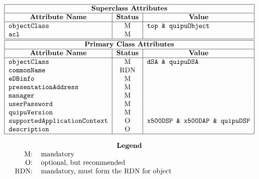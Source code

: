 
\[\begin{tabular}{|l|c|l|}
\hline
\multicolumn{3}{|c|}{\bf Superclass Attributes}\\
\hline
\multicolumn{1}{|c|}{\bf Attribute Name}&
			\multicolumn{1}{c|}{\bf Status}&
				\multicolumn{1}{c|}{\bf Value}\\
\hline
\verb"objectClass"&	M&	\verb"top & quipuObject"\\
\verb"acl"&		M&	\\
\hline
\hline
\multicolumn{3}{|c|}{\bf Primary Class Attributes}\\
\hline
\multicolumn{1}{|c|}{\bf Attribute Name}&
			\multicolumn{1}{c|}{\bf Status}&
				\multicolumn{1}{c|}{\bf Value}\\
\hline
\verb"objectClass"&	M&	\verb"dSA & quipuDSA"\\
\verb"commonName"&	RDN&	\\
\verb"eDBinfo"&		M&	\\
\verb"presentationAddress"&
			M&	\\
\verb"manager"&		M&	\\
\verb"userPassword"&	M&	\\
\verb"quipuVersion"&	M&	\\
\verb"supportedApplicationContext"&
			O&	\verb"x500DSP & x500DAP & quipuDSP"\\
\verb"description"&	O&	\\
\hline
\end{tabular}\]

\[\begin{tabular}{rp{4in}}
\multicolumn{2}{c}{\bf Legend}\\
M:&	mandatory\\
O:&	optional, but recommended\\
RDN:&	mandatory, must form the RDN for object
\end{tabular}\]
